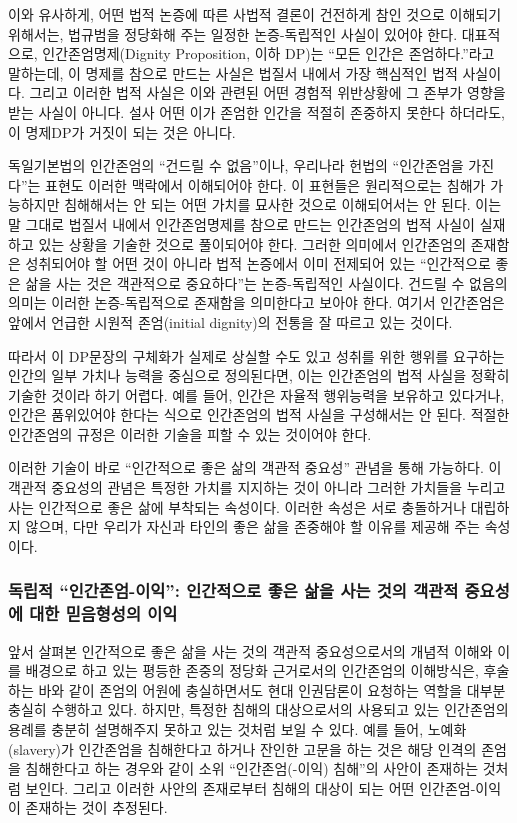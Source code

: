이와 유사하게, 어떤 법적 논증에 따른 사법적 결론이 건전하게 참인 것으로 이해되기 위해서는, 법규범을 정당화해 주는 일정한 논증-독립적인 사실이 있어야 한다. 대표적으로, 인간존엄명제(Dignity Proposition, 이하 DP)는 ``모든 인간은 존엄하다.''라고 말하는데, 이 명제를 참으로 만드는 사실은 법질서 내에서 가장 핵심적인 법적 사실이다. 그리고 이러한 법적 사실은 이와 관련된 어떤 경험적 위반상황에 그 존부가 영향을 받는 사실이 아니다. 설사 어떤 이가 존엄한 인간을 적절히 존중하지 못한다 하더라도, 이 명제DP가 거짓이 되는 것은 아니다.

독일기본법의 인간존엄의 ``건드릴 수 없음''이나, 우리나라 헌법의 ``인간존엄을 가진다''는 표현도 이러한 맥락에서 이해되어야 한다. 이 표현들은 원리적으로는 침해가 가능하지만 침해해서는 안 되는 어떤 가치를 묘사한 것으로 이해되어서는 안 된다. 이는 말 그대로 법질서 내에서 인간존엄명제를 참으로 만드는 인간존엄의 법적 사실이 실재하고 있는 상황을 기술한 것으로 풀이되어야 한다. 그러한 의미에서 인간존엄의 존재함은 성취되어야 할 어떤 것이 아니라 법적 논증에서 이미 전제되어 있는 ``인간적으로 좋은 삶을 사는 것은 객관적으로 중요하다''는 논증-독립적인 사실이다. 건드릴 수 없음의 의미는 이러한 논증-독립적으로 존재함을 의미한다고 보아야 한다. 여기서 인간존엄은 앞에서 언급한 시원적 존엄(initial dignity)의 전통을 잘 따르고 있는 것이다.

따라서 이 DP문장의 구체화가 실제로 상실할 수도 있고 성취를 위한 행위를 요구하는 인간의 일부 가치나 능력을 중심으로 정의된다면, 이는 인간존엄의 법적 사실을 정확히 기술한 것이라 하기 어렵다. 예를 들어, 인간은 자율적 행위능력을 보유하고 있다거나, 인간은 품위있어야 한다는 식으로 인간존엄의 법적 사실을 구성해서는 안 된다. 적절한 인간존엄의 규정은 이러한 기술을 피할 수 있는 것이어야 한다.

이러한 기술이 바로 ``인간적으로 좋은 삶의 객관적 중요성'' 관념을 통해 가능하다. 이 객관적 중요성의 관념은 특정한 가치를 지지하는 것이 아니라 그러한 가치들을 누리고 사는 인간적으로 좋은 삶에 부착되는 속성이다. 이러한 속성은 서로 충돌하거나 대립하지 않으며, 다만 우리가 자신과 타인의 좋은 삶을 존중해야 할 이유를 제공해 주는 속성이다.

\subsubsection{독립적 ``인간존엄-이익'': 인간적으로 좋은 삶을 사는 것의 객관적 중요성에 대한 믿음형성의 이익}

앞서 살펴본 인간적으로 좋은 삶을 사는 것의 객관적 중요성으로서의 개념적 이해와 이를 배경으로 하고 있는 평등한 존중의 정당화 근거로서의 인간존엄의 이해방식은, 후술하는 바와 같이 존엄의 어원에 충실하면서도 현대 인권담론이 요청하는 역할을 대부분 충실히 수행하고 있다. 하지만, 특정한 침해의 대상으로서의 사용되고 있는 인간존엄의 용례를 충분히 설명해주지 못하고 있는 것처럼 보일 수 있다. 예를 들어, 노예화(slavery)가 인간존엄을 침해한다고 하거나 잔인한 고문을 하는 것은 해당 인격의 존엄을 침해한다고 하는 경우와 같이 소위 ``인간존엄(-이익) 침해''의 사안이 존재하는 것처럼 보인다. 그리고 이러한 사안의 존재로부터 침해의 대상이 되는 어떤 인간존엄-이익이 존재하는 것이 추정된다.


